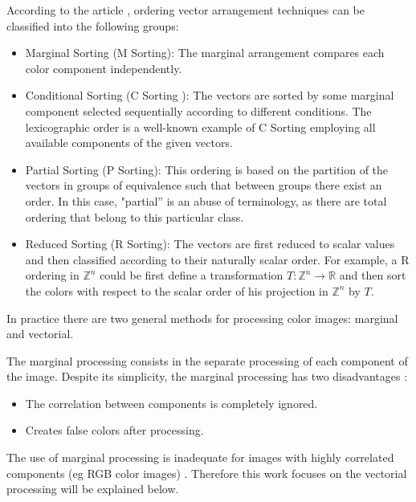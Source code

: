 
According to the article  \cite{barnett1976ordering}, ordering vector arrangement techniques can be classified into the following groups:
\begin{itemize}
\item Marginal Sorting (M Sorting): The marginal arrangement compares each color component independently.
\item Conditional Sorting (C Sorting ): The vectors are sorted by some marginal component selected sequentially according to different conditions. The lexicographic order is a well-known example of C Sorting  employing all available components of the given vectors.
\item Partial Sorting (P Sorting): This ordering is based on the partition of the vectors in groups of equivalence such that  between groups there exist an order. In this case, "partial'' is an abuse of terminology, as there are total ordering that belong to this particular class. 
\item Reduced Sorting (R Sorting): The vectors are first reduced to scalar values and then classified according to their naturally scalar order. For example, a R ordering in  $\mathbb{Z}^n$ could be first define a transformation $T:\mathbb{Z}^n\rightarrow \mathbb{R}$ and then sort the colors with respect to the scalar order of his projection in $\mathbb{Z}^n$ by $T$.
\end{itemize}

In practice there are two general methods for processing color images: marginal and vectorial.

The marginal processing consists in the separate processing of each component of the image. Despite its simplicity, the marginal processing has two disadvantages \cite{aptoula2007comparative}: 
\begin{itemize}
    \item The correlation between components is completely ignored.
    \item Creates false colors after processing.
\end{itemize}

The use of marginal processing is inadequate for images with highly correlated components (eg RGB color images) \cite{astola1990vector}. Therefore this work focuses on the vectorial processing will be explained below. 

